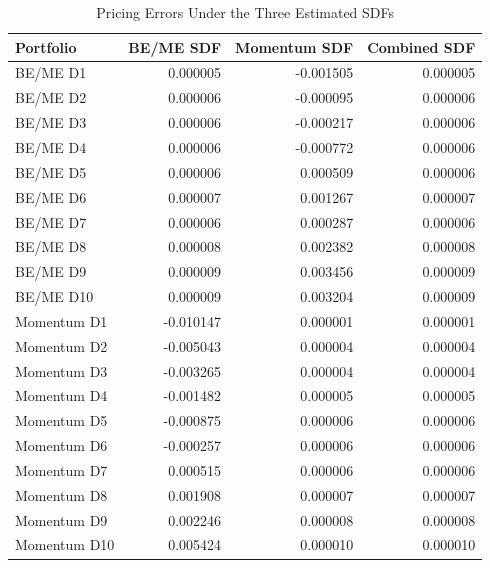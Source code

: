 \begin{table}[H]
  \centering
  \caption{Pricing Errors Under the Three Estimated SDFs}
  \label{tab:2d-pricing-errors}
  \begin{tabular}{lrrr}
    \toprule
    Portfolio & BE/ME SDF & Momentum SDF & Combined SDF \\
    \midrule
    BE/ME D1 & 0.000005 & -0.001505 & 0.000005 \\
    BE/ME D2 & 0.000006 & -0.000095 & 0.000006 \\
    BE/ME D3 & 0.000006 & -0.000217 & 0.000006 \\
    BE/ME D4 & 0.000006 & -0.000772 & 0.000006 \\
    BE/ME D5 & 0.000006 & 0.000509 & 0.000006 \\
    BE/ME D6 & 0.000007 & 0.001267 & 0.000007 \\
    BE/ME D7 & 0.000006 & 0.000287 & 0.000006 \\
    BE/ME D8 & 0.000008 & 0.002382 & 0.000008 \\
    BE/ME D9 & 0.000009 & 0.003456 & 0.000009 \\
    BE/ME D10 & 0.000009 & 0.003204 & 0.000009 \\
    Momentum D1 & -0.010147 & 0.000001 & 0.000001 \\
    Momentum D2 & -0.005043 & 0.000004 & 0.000004 \\
    Momentum D3 & -0.003265 & 0.000004 & 0.000004 \\
    Momentum D4 & -0.001482 & 0.000005 & 0.000005 \\
    Momentum D5 & -0.000875 & 0.000006 & 0.000006 \\
    Momentum D6 & -0.000257 & 0.000006 & 0.000006 \\
    Momentum D7 & 0.000515 & 0.000006 & 0.000006 \\
    Momentum D8 & 0.001908 & 0.000007 & 0.000007 \\
    Momentum D9 & 0.002246 & 0.000008 & 0.000008 \\
    Momentum D10 & 0.005424 & 0.000010 & 0.000010 \\
    \bottomrule
  \end{tabular}
\end{table}

